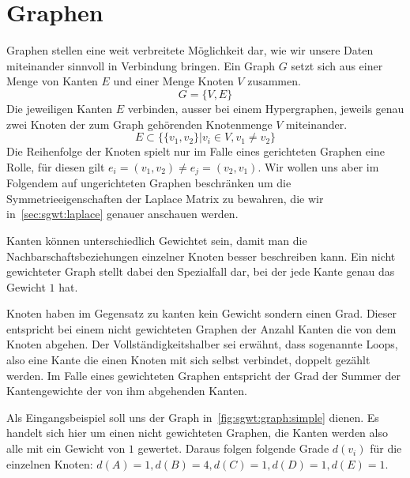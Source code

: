 
\section{Graphen\label{sec:sgwt:graphs}}

Graphen stellen eine weit verbreitete M\"oglichkeit dar, wie wir unsere Daten 
miteinander sinnvoll in Verbindung bringen. Ein Graph $G$ setzt sich aus einer 
Menge von Kanten $E$ und einer Menge Knoten $V$ zusammen.
\begin{equation*}
G = \{V, E\}
\end{equation*}
Die jeweiligen Kanten $E$ verbinden, ausser bei einem Hypergraphen, jeweils 
genau zwei Knoten der zum Graph geh\"orenden Knotenmenge $V$ miteinander.
\begin{equation*}
E \subset \{\{v_1, v_2\} | v_i \in V, v_1 \neq v_2 \}
\end{equation*}
Die Reihenfolge der Knoten spielt nur im Falle eines gerichteten Graphen eine 
Rolle, f\"ur diesen gilt $e_i = (v_1, v_2) \neq e_j = (v_2, v_1)$. Wir wollen 
uns aber im Folgendem auf ungerichteten Graphen beschr\"anken um die 
Symmetrieeigenschaften der Laplace Matrix zu bewahren, die wir 
in~\cref{sec:sgwt:laplace} genauer anschauen werden.

Kanten k\"onnen unterschiedlich Gewichtet sein, damit man die 
Nachbarschaftsbeziehungen einzelner Knoten besser beschreiben kann. Ein nicht 
gewichteter Graph stellt dabei den Spezialfall dar, bei der jede Kante genau 
das Gewicht $1$ hat.

Knoten haben im Gegensatz zu kanten kein Gewicht sondern einen Grad. Dieser 
entspricht bei einem nicht gewichteten Graphen der Anzahl Kanten die von dem 
Knoten abgehen. Der Vollst\"andigkeitshalber sei erw\"ahnt, dass sogenannte 
Loops, also eine Kante die einen Knoten mit sich selbst verbindet, doppelt 
gez\"ahlt werden. Im Falle eines gewichteten Graphen entspricht der Grad der 
Summer der Kantengewichte der von ihm abgehenden Kanten.

Als Eingangsbeispiel soll uns der Graph in~\cref{fig:sgwt:graph:simple} dienen. 
Es handelt sich hier um einen nicht gewichteten Graphen, die Kanten werden also 
alle mit ein Gewicht von $1$ gewertet. Daraus folgen folgende Grade $d(v_i)$ 
f\"ur die einzelnen Knoten: $d(A) = 1, d(B) = 4, d(C) = 1, d(D) = 1, d(E) = 1$.

